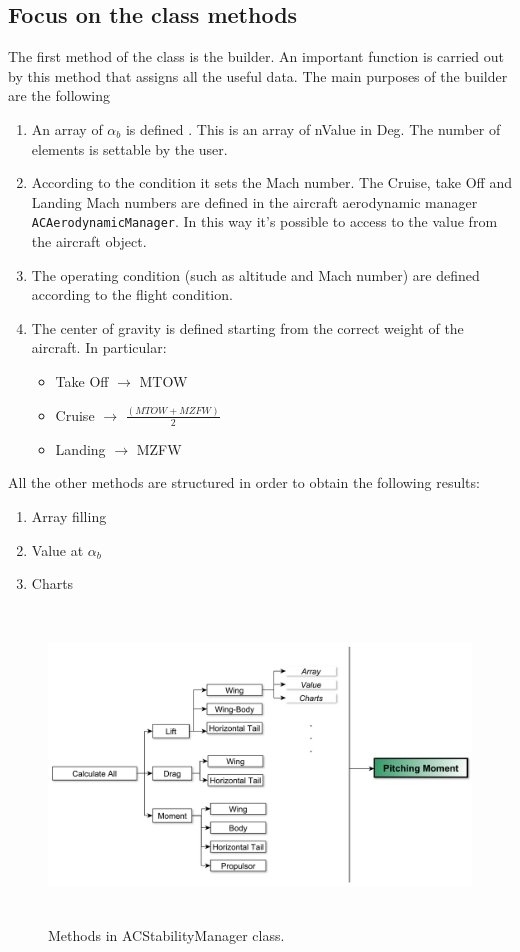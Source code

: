 \subsection{Focus on the class methods}
The first method of the class is the builder. An important function is carried out by this method that assigns all the useful data. The main purposes of the builder are the following

\begin{enumerate}
	\item An array of $\alpha_b$ is defined . This is an array of nValue in Deg. The number of elements is settable by the user.
	\item According to the condition it sets the Mach number. The Cruise, take Off and Landing Mach numbers are defined in the aircraft aerodynamic manager \texttt{ACAerodynamicManager}. In this way it's possible to access to the value from the aircraft object.
	\item The operating condition (such as altitude and Mach number) are defined according to the flight condition.
	\item The center of gravity is defined starting from the correct weight of the aircraft. In particular:
	\begin{itemize}
		\item Take Off $\rightarrow$ MTOW
		\item Cruise $\rightarrow$ $\frac{(MTOW + MZFW)}{2}$
		\item Landing $\rightarrow$  MZFW
	\end{itemize}
\end{enumerate}



 All the other methods are structured in order to obtain the following results:
\begin{enumerate}
	\item Array filling
	\item Value at $\alpha_b$
	\item Charts
\end{enumerate}
\begin{figure}[H]
	\centering
	\includegraphics[height=8.3cm]{Immagini/acclass}
	\caption{Methods in ACStabilityManager class.}
	\label{acc}
\end{figure}


